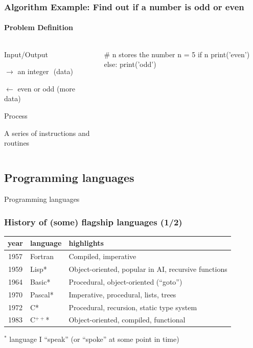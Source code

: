 \documentclass[xcolor=x11names]{beamer}
\begin{document}
\begin{frame}[fragile]
\frametitle{Algorithm Example: Find out if a number is odd or even}
\framesubtitle{Problem Definition}
\begin{columns}

\begin{column}{0.5\textwidth}
\alert{Input/Output}

$\rightarrow$ an integer\,\,\,\,(data)

$\leftarrow$ even or odd 	(more data)	\pause 

\bigskip
\alert{Process}

A series of instructions and routines
\end{column}

\begin{column}{0.4\textwidth}

\begin{python}
# n stores the number
n = 5 
if n%
 	print('even')
else: 
 	print('odd')
\end{python}

\end{column}
\end{columns}
\end{frame}

\begin{frame}
\section{Programming languages}
\centering
\alert{Programming languages}
\end{frame}
 
\begin{frame}
\frametitle{History of (some) flagship languages (1/2)}

\begin{center}
\begin{tabular}{clp{79mm}}
\hline
\bf year	& \bf language	& \bf highlights	\\
\hline
1957	& Fortran	& Compiled, imperative	\\
1959	& Lisp*		& Object-oriented, popular in AI, recursive functions	\\
1964	& Basic*	& Procedural, object-oriented (``goto'')	\\
1970	& Pascal*	& Imperative, procedural, lists, trees	\\
1972	& C*		& Procedural, recursion, static type system	\\
1983	& C$^{++}$*		& Object-oriented, compiled, functional	\\
\hline
\end{tabular}
\end{center}

\bigskip
$^*$ language I ``speak'' (or ``spoke'' at some point in time)
\end{frame}
\end{document}
